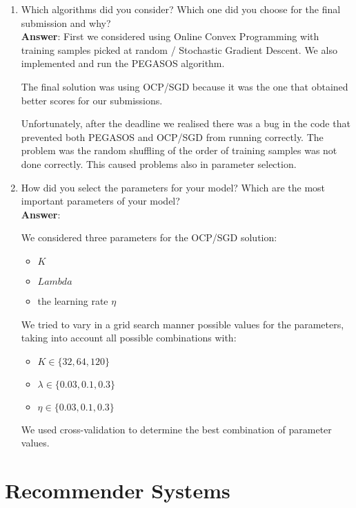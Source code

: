 \documentclass[11pt]{article}
\begin{document}
\begin{enumerate} \item Which algorithms did you consider? Which one did you
choose for the final submission and why? \\
\textbf{Answer}:
First we considered using Online Convex Programming with training samples
picked at random / Stochastic Gradient Descent. We also implemented and run the
PEGASOS algorithm. 

The final solution was using OCP/SGD because it was the one that obtained
better scores for our submissions. 

Unfortunately, after the deadline we realised there was a bug in the code that
prevented both PEGASOS and OCP/SGD from running correctly. The problem was the
random shuffling of the order of training samples was not done correctly. This
caused problems also in parameter selection.

\item How did you select the parameters for your model? Which are the
  most important parameters of your model? \\

\textbf{Answer}:

We considered three parameters for the OCP/SGD solution: 
\begin{itemize}
\item $K$
\item $Lambda$ 
\item the learning rate $\eta$
\end{itemize}

We tried to vary in a grid search manner possible values for the parameters,
taking into account all possible combinations with:
\begin{itemize}
\item $K \in \{32, 64, 120\}$
\item $\lambda \in \{0.03, 0.1, 0.3\}$
\item $\eta \in \{0.03, 0.1, 0.3\}$
\end{itemize}
We used cross-validation to determine the best combination of parameter values.

\end{enumerate}

\section{Recommender Systems}
\end{document}
